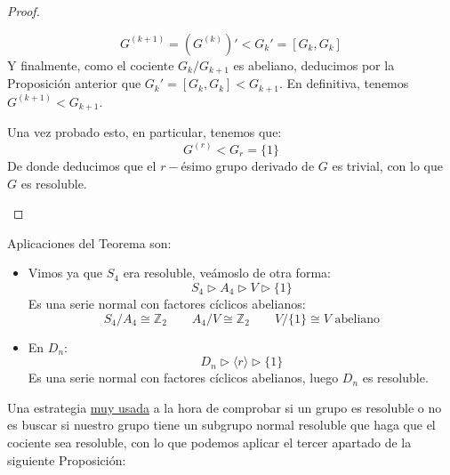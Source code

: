 \begin{teo}
\begin{proof}
\begin{description}
\begin{itemize}
                        \begin{equation*}
                            G^{(k+1)} = (G^{(k)})' < G_k' = [G_k, G_k]
                        \end{equation*}
                        Y finalmente, como el cociente $G_k/G_{k+1}$ es abeliano, deducimos por la Proposición anterior que $G_k' = [G_k, G_k] < G_{k+1}$. En definitiva, tenemos $G^{(k+1)} < G_{k+1}$.
                \end{itemize}
                Una vez probado esto, en particular, tenemos que:
                \begin{equation*}
                    G^{(r)} < G_r = \{1\}
                \end{equation*}
                De donde deducimos que el $r-$ésimo grupo derivado de $G$ es trivial, con lo que $G$ es resoluble.
        \end{description}
    \end{proof}
\end{teo}

\begin{ejemplo}
    Aplicaciones del Teorema son:
    \begin{itemize}
        \item Vimos ya que $S_4$ era resoluble, veámoslo de otra forma:
            \begin{equation*}
                S_4 \rhd A_4 \rhd V \rhd \{1\}
            \end{equation*}
            Es una serie normal con factores cíclicos abelianos:
            \begin{equation*}
                S_4/A_4\cong \mathbb{Z}_2 \qquad A_4/V\cong \mathbb{Z}_2 \qquad V/\{1\}\cong V \text{\ abeliano}
            \end{equation*}
        \item En $D_n$:
            \begin{equation*}
                D_n \rhd \langle r \rangle  \rhd \{1\}
            \end{equation*}
            Es una serie normal con factores cíclicos abelianos, luego $D_n$ es resoluble.
    \end{itemize}
\end{ejemplo}

\noindent
Una estrategia \underline{muy usada} a la hora de comprobar si un grupo es resoluble o no es buscar si nuestro grupo tiene un subgrupo normal resoluble que haga que el cociente sea resoluble, con lo que podemos aplicar el tercer apartado de la siguiente Proposición:

